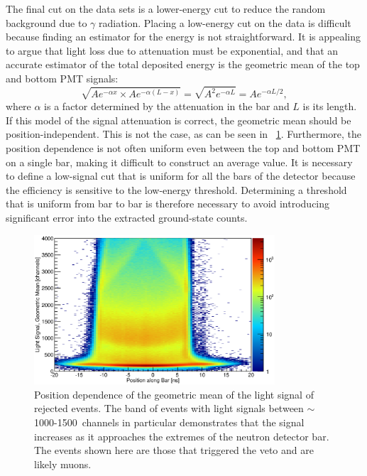 The final cut on the data sets is a lower-energy cut to reduce the random background due to $\gamma$ radiation.  Placing a low-energy cut on the data is difficult because finding an estimator for the energy is not straightforward.  It is appealing to argue that light loss due to attenuation must be exponential, and that an accurate estimator of the total deposited energy is the geometric mean of the top and bottom PMT signals:
\begin{equation}
\sqrt{Ae^{-\alpha x}\times Ae^{-\alpha (L-x)}} = \sqrt{A^2e^{-\alpha L}} = Ae^{-\alpha L/2},
\end{equation}
where $\alpha$ is a factor determined by the attenuation in the bar and $L$ is its length.  If this model of the signal attenuation is correct, the geometric mean should be position-independent.  This is not the case, as can be seen in {\fig}~\ref{fig:product_positionDependence}.  Furthermore, the position dependence is not often uniform even between the top and bottom PMT on a single bar, making it difficult to construct an average value.  It is necessary to define a low-signal cut that is uniform for all the bars of the detector because the efficiency is sensitive to the low-energy threshold.  Determining a threshold that is uniform from bar to bar is therefore necessary to avoid introducing significant error into the extracted ground-state counts.
\begin{figure}[!htbp]
\centering
\includegraphics[width=0.8\textwidth]{figures/positionVSenergy.eps}
\caption[Position dependence of the geometric mean of the light signal of rejected events.]{Position dependence of the geometric mean of the light signal of rejected events.  The band of events with light signals between $\sim$1000-1500~channels in particular demonstrates that the signal increases as it approaches the extremes of the neutron detector bar.  The events shown here are those that triggered the veto and are likely muons.}
\label{fig:product_positionDependence}
\end{figure}

